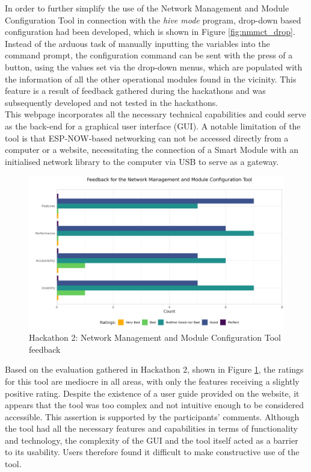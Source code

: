 In order to further simplify the use of the Network Management and Module Configuration Tool in connection with the \textit{hive mode} program, drop-down based configuration had been developed, which is shown in Figure \ref{fig:nmmct_drop}. Instead of the arduous task of manually inputting the variables into the command prompt, the configuration command can be sent with the press of a button, using the values set via the drop-down menus, which are populated with the information of all the other operational modules found in the vicinity. This feature is a result of feedback gathered during the hackathons and was subsequently developed and not tested in the hackathons. \\

This webpage incorporates all the necessary technical capabilities and could serve as the back-end for a graphical user interface (GUI). A notable limitation of the tool is that ESP-NOW-based networking can not be accessed directly from a computer or a website, necessitating the connection of a Smart Module with an initialised network library to the computer via USB to serve as a gateway.

\begin{figure}[H]
    \centering
    \includegraphics[width=.75\linewidth]{rstudio/survey/plots/nmmct.png}
    \vspace{\ftspace}
    \caption{Hackathon 2: Network Management and Module Configuration Tool feedback}
    \vspace{\ftspace}
    \label{fig:nmmct_q}
\end{figure}

Based on the evaluation gathered in Hackathon 2, shown in Figure \ref{fig:nmmct_q}, the ratings for this tool are mediocre in all areas, with only the features receiving a slightly positive rating. Despite the existence of a user guide provided on the website, it appears that the tool was too complex and not intuitive enough to be considered accessible. This assertion is supported by the participants' comments. Although the tool had all the necessary features and capabilities in terms of functionality and technology, the complexity of the GUI and the tool itself acted as a barrier to its usability. Users therefore found it difficult to make constructive use of the tool.

